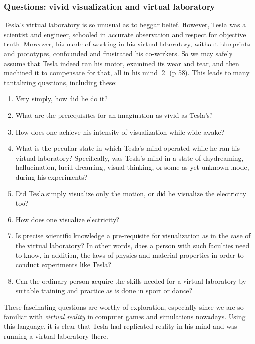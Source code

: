 \documentclass[
  12pt,
  british,
  a4paper,
]{article}
\providecommand{\tightlist}{%
  \setlength{\itemsep}{0pt}\setlength{\parskip}{0pt}}
\begin{document}
\hypertarget{questions-vivid-visualization-and-virtual-laboratory}{%
\subsubsection{Questions: vivid visualization and virtual
laboratory}\label{questions-vivid-visualization-and-virtual-laboratory}}

Tesla's virtual laboratory is so unusual as to beggar belief. However,
Tesla was a scientist and engineer, schooled in accurate observation and
respect for objective truth. Moreover, his mode of working in his
virtual laboratory, without blueprints and prototypes, confounded and
frustrated his co-workers. So we may safely assume that Tesla indeed ran
his motor, examined its wear and tear, and then machined it to
compensate for that, all in his mind {[}2{]} (p 58). This leads to many
tantalizing questions, including these:

\begin{enumerate}
\tightlist
\item
  Very simply, how did he do it?
\item
  What are the prerequisites for an imagination as vivid as Tesla's?
\item
  How does one achieve his intensity of visualization while wide awake?
\item
  What is the peculiar state in which Tesla's mind operated while he ran
  his virtual laboratory? Specifically, was Tesla's mind in a state of
  daydreaming, hallucination, lucid dreaming, visual thinking, or some
  as yet unknown mode, during his experiments?
\item
  Did Tesla simply visualize only the motion, or did he visualize the
  electricity too?
\item
  How does one visualize electricity?
\item
  Is precise scientific knowledge a pre-requisite for visualization as
  in the case of the virtual laboratory? In other words, does a person
  with such faculties need to know, in addition, the laws of physics and
  material properties in order to conduct experiments like Tesla?
\item
  Can the ordinary person acquire the skills needed for a virtual
  laboratory by suitable training and practice as is done in sport or
  dance?
\end{enumerate}

These fascinating questions are worthy of exploration, especially since
we are so familiar with
\href{https://en.wikipedia.org/wiki/Virtual_reality}{\emph{virtual
reality}} in computer games and simulations nowadays. Using this
language, it is clear that Tesla had replicated reality in his mind and
was running a virtual laboratory there.
\end{document}
